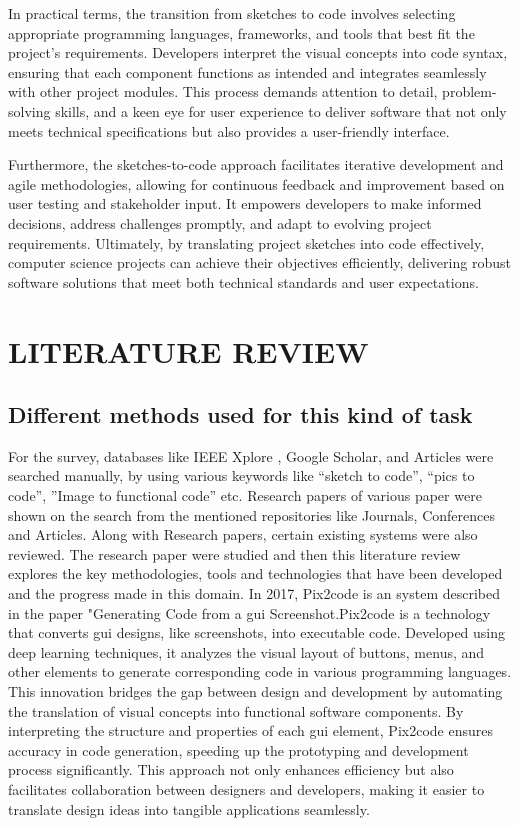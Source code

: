 \documentclass{ioereport}
\begin{document}
In practical terms, the transition from sketches to code involves selecting appropriate
programming languages, frameworks, and tools that best fit the project's requirements.
Developers interpret the visual concepts into code syntax, ensuring that each
component functions as intended and integrates seamlessly with other project modules.
This process demands attention to detail, problem-solving skills, and a keen eye for
user experience to deliver software that not only meets technical specifications but also
provides a user-friendly interface.

Furthermore, the sketches-to-code approach facilitates iterative development and agile
methodologies, allowing for continuous feedback and improvement based on user
testing and stakeholder input. It empowers developers to make informed decisions,
address challenges promptly, and adapt to evolving project requirements. Ultimately,
by translating project sketches into code effectively, computer science projects can
achieve their objectives efficiently, delivering robust software solutions that meet both
technical standards and user expectations.
    \pagebreak
    
\section{\MakeUppercase{Literature Review}}
    \subsection{Different methods used for this kind of task}
    For the survey, databases like IEEE Xplore , Google Scholar, and Articles were
searched manually, by using various keywords like “sketch to code”, “pics to code”,
”Image to functional code” etc. Research papers of various paper were shown on the
search from the mentioned repositories like Journals, Conferences and Articles. Along
with Research papers, certain existing systems were also reviewed. The research paper
were studied and then this literature review explores the key methodologies, tools and
technologies that have been developed and the progress made in this domain. In 2017, Pix2code is an system described in the paper "Generating Code from a
\gls{gui} Screenshot.Pix2code is a technology that converts \gls{gui} designs, like screenshots, into executable code. Developed using
deep learning techniques, it analyzes the visual layout of buttons, menus, and other
elements to generate corresponding code in various programming languages. This
innovation bridges the gap between design and development by automating the
translation of visual concepts into functional software components. By interpreting the
structure and properties of each \gls{gui} element, Pix2code ensures accuracy in code
generation, speeding up the prototyping and development process significantly. This
approach not only enhances efficiency but also facilitates collaboration between
designers and developers, making it easier to translate design ideas into tangible
applications seamlessly. \cite{beltramelli2017pix2codegeneratingcodegraphical}
\end{document}
